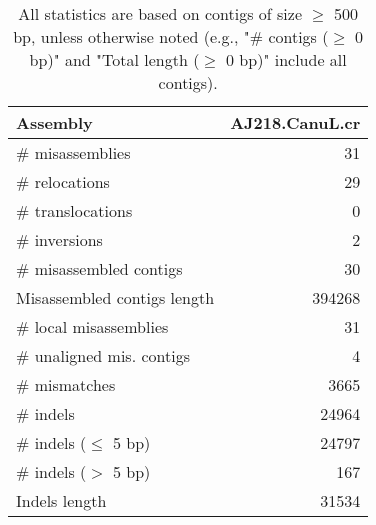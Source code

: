 \documentclass[12pt,a4paper]{article}
\begin{document}
\begin{table}[ht]
\begin{center}
\caption{All statistics are based on contigs of size $\geq$ 500 bp, unless otherwise noted (e.g., "\# contigs ($\geq$ 0 bp)" and "Total length ($\geq$ 0 bp)" include all contigs).}
\begin{tabular}{|l*{1}{|r}|}
\hline
Assembly & AJ218.CanuL.cr \\ \hline
\# misassemblies & 31 \\ \hline
\hspace{5mm}\# relocations & 29 \\ \hline
\hspace{5mm}\# translocations & 0 \\ \hline
\hspace{5mm}\# inversions & 2 \\ \hline
\# misassembled contigs & 30 \\ \hline
Misassembled contigs length & 394268 \\ \hline
\# local misassemblies & 31 \\ \hline
\# unaligned mis. contigs & 4 \\ \hline
\# mismatches & 3665 \\ \hline
\# indels & 24964 \\ \hline
\hspace{5mm}\# indels ($\leq$ 5 bp) & 24797 \\ \hline
\hspace{5mm}\# indels ($>$ 5 bp) & 167 \\ \hline
Indels length & 31534 \\ \hline
\end{tabular}
\end{center}
\end{table}
\end{document}
